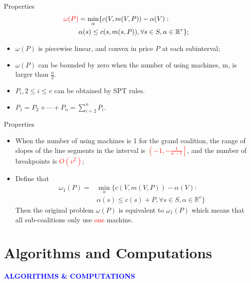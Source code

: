 \documentclass[14pt]{beamer}
\begin{document}
\begin{frame}{Properties}
	\vspace{-12mm}
		\begin{eqnarray*}
		\textcolor{red}{\omega(P)} & =\mathop{\min}_{\alpha}\{c(V,m(V,P))-\alpha(V): \\
		 &\alpha(s)\leq c(s,m(s,P)),\forall s \in S, \alpha\in\mathbb{R}^{v}\};
		\end{eqnarray*}

		\begin{itemize}
		\justifying
			\pause
			\item ${\omega(P)}$ is piecewise linear, and convex in price $P$ at each subinterval;
			\pause
			\item $\omega(P)$ can be bounded by zero when the number of using machines, m, is larger than $\frac{n}{2}$.
			\pause
			\item $P_i, 2 \leq i \leq v$ can be obtained by SPT rules.
			\pause
			\item $P_{1}=P_{2}+\cdots+P_{n}=\sum_{i=2}^n P_i$.

	\end{itemize}
\end{frame}


\begin{frame}{Properties}
	\vspace{-1mm}
		\begin{itemize}
		\justifying
			\item When the number of using machines is 1 for the grand coalition, the range of slopes of the line segments in the interval is \textcolor{red}{$\left( -1 , -\frac{1}{n-1} \right]$}, and the number of breakpoints is \textcolor{red}{$ O(v^2)$};
			\pause
			\item Define that
			\begin{eqnarray*}
			{\omega_1(P)}=&\mathop{\min}_{\alpha}\{c(V,m(V,P))-\alpha(V): \\
			&\alpha(s)\leq c(s)+P,\forall s \in S, \alpha\in\mathbb{R}^{v}\}
			\end{eqnarray*}
			Then the original problem $\omega(P)$ is equivalent to $\omega_1(P)$ which means that all sub-coalitions only use \textcolor{red}{one} machine.

	\end{itemize}
\end{frame}

\section{Algorithms and Computations}
\begin{frame}
\centering
\large
\textcolor{blue}{\bf {\huge A}LGORITHMS \&  {\huge C}OMPUTATIONS}
\end{frame}
\end{document}

